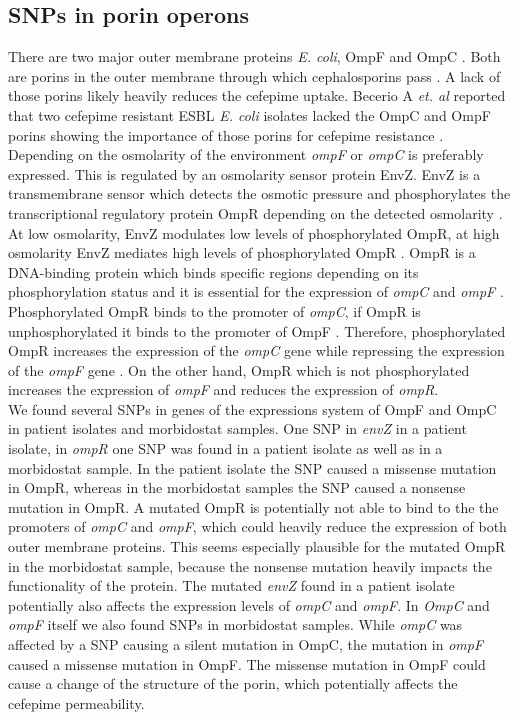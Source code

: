 \subsection{SNPs in porin operons}
There are two major outer membrane proteins \textit{E. coli}, OmpF and OmpC \cite{rampersaud_ompr_1994}. Both are porins in the outer membrane through which cephalosporins pass \cite{masi_structure_2013}. A lack of those porins likely heavily reduces the cefepime uptake. Becerio A \textit{et. al} reported that two cefepime resistant ESBL \textit{E. coli} isolates lacked the OmpC and OmpF porins showing the importance of those porins for cefepime resistance \cite{beceiro_false_2011}.  Depending on the osmolarity of the environment \textit{ompF} or \textit{ompC} is preferably expressed. This is regulated by an osmolarity sensor protein EnvZ. EnvZ is a transmembrane sensor which detects the osmotic pressure and phosphorylates the transcriptional regulatory protein OmpR depending on the detected osmolarity \cite{rampersaud_ompr_1994}. At low osmolarity, EnvZ modulates low levels of phosphorylated OmpR, at high osmolarity EnvZ mediates high levels of phosphorylated OmpR \cite{rampersaud_ompr_1994}. OmpR is a DNA-binding protein which binds specific regions depending on its phosphorylation status and it is essential for the expression of \textit{ompC} and \textit{ompF} \cite{rampersaud_ompr_1994}. Phosphorylated OmpR binds to the promoter of \textit{ompC}, if OmpR is unphosphorylated it binds to the promoter of OmpF \cite{rampersaud_ompr_1994}. Therefore, phosphorylated OmpR increases the expression of the \textit{ompC} gene while repressing the expression of the \textit{ompF} gene \cite{rampersaud_ompr_1994}. On the other hand, OmpR which is not phosphorylated increases the expression of \textit{ompF} and reduces the expression of \textit{ompR}. \\
We found several SNPs in genes of the expressions system of OmpF and OmpC in patient isolates and morbidostat samples. One SNP in \textit{envZ} in a patient isolate, in \textit{ompR} one SNP was found in a patient isolate as well as in a morbidostat sample. In the patient isolate the SNP caused a missense mutation in OmpR, whereas in the morbidostat samples the SNP caused a nonsense mutation in OmpR. A mutated OmpR is potentially not able to bind to the the promoters of \textit{ompC} and \textit{ompF}, which could heavily reduce the expression of both outer membrane proteins. This seems especially plausible for the mutated OmpR in the morbidostat sample, because the nonsense mutation heavily impacts the functionality of the protein. The mutated \textit{envZ} found in a patient isolate potentially also affects the expression levels of \textit{ompC} and \textit{ompF}. In \textit{OmpC} and \textit{ompF} itself we also found SNPs in morbidostat samples. While \textit{ompC} was affected by a SNP causing a silent mutation in OmpC, the mutation in \textit{ompF} caused a missense mutation in OmpF. The missense mutation in OmpF could cause a change of the structure of the porin, which potentially affects the cefepime permeability.\\
